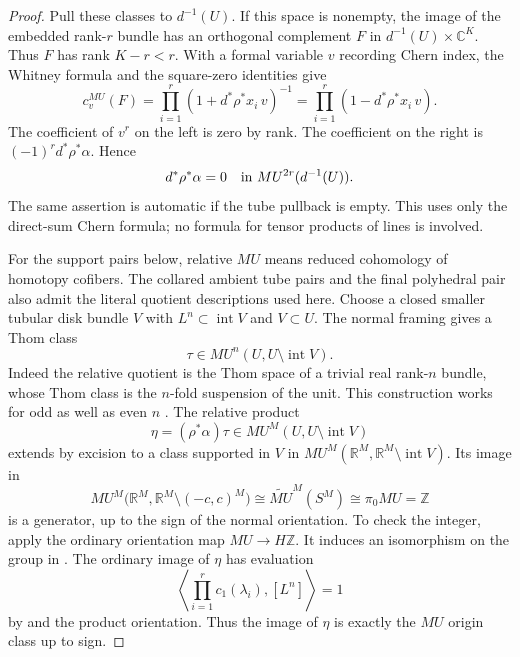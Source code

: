 \begin{proof}
Pull these classes to $d^{-1}(U)$.  If this space is nonempty, the
image of the embedded rank-$r$ bundle has an orthogonal complement
$F$ in $d^{-1}(U)\times\mathbb C^K$.  Thus $F$ has rank $K-r<r$.
With a formal variable $v$ recording Chern index, the
Whitney formula and the square-zero identities give
\begin{equation}
 \label{eq:inverse-chern}
 c_v^{MU}(F)
    =\prod_{i=1}^r(1+d^*\rho^*x_i\,v)^{-1}
    =\prod_{i=1}^r(1-d^*\rho^*x_i\,v).
\end{equation}
The coefficient of $v^r$ on the left is zero by rank.  The
coefficient on the right is $(-1)^r d^*\rho^*\alpha$.  Hence
\begin{equation}
 \label{eq:euler-tube-zero}
 d^*\rho^*\alpha=0\quad\hbox{in }MU^{2r}(d^{-1}(U)).
\end{equation}
The same assertion is automatic if the tube pullback is empty.
This uses only the direct-sum Chern formula; no formula for tensor
products of lines is involved.

For the support pairs below, relative $MU$ means reduced cohomology
of homotopy cofibers.  The collared ambient tube pairs and the final
polyhedral pair also admit the literal quotient descriptions used here.
Choose a closed smaller tubular disk bundle $V$ with
$L^n\subset\operatorname{int}V$ and $V\subset U$.
The normal framing gives a Thom class
\[
 \tau\in MU^n(U,U\setminus\operatorname{int}V).
\]
Indeed the relative quotient is the Thom space of a trivial real
rank-$n$ bundle, whose Thom class is the $n$-fold suspension of the
unit.  This construction works for odd as well as even $n$
\cite[Lecture 5, Example 1]{Lurie2010}.  The relative product
\[
 \eta=(\rho^*\alpha)\tau
      \in MU^M(U,U\setminus\operatorname{int}V)
\]
extends by excision to a class supported in $V$ in
$MU^M(\mathbb R^M,\mathbb R^M\setminus\operatorname{int}V)$.
Its image in
\begin{equation}
 \label{eq:ambient-point-group}
 MU^M\bigl(\mathbb R^M,
                 \mathbb R^M\setminus(-c,c)^M\bigr)
       \cong\widetilde{MU}^M(S^M)
       \cong\pi_0MU=\mathbb Z
\end{equation}
is a generator, up to the sign of the normal orientation.
To check the integer, apply the ordinary orientation map
$MU\to H\mathbb Z$.  It induces an isomorphism on the group in
.  The ordinary image of $\eta$ has
evaluation
\[
 \left\langle\prod_{i=1}^r c_1(\lambda_i),[L^n]\right\rangle=1
\]
by  and the product orientation.  Thus the
image of $\eta$ is exactly the $MU$ origin class up to sign.


\end{proof}
